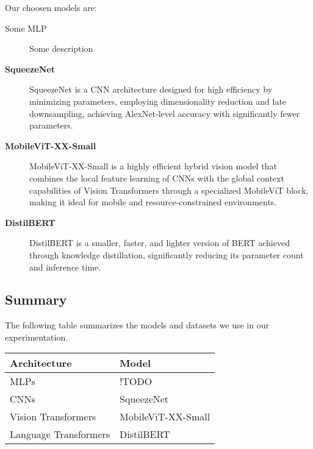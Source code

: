 \documentclass{article}
\begin{document}
Our choosen models are:
\begin{description}
    \item[Some MLP] {Some description}
    \item[\textbf{SqueezeNet \cite{squeezenet}}] SqueezeNet is a CNN architecture designed for high efficiency by minimizing parameters, employing dimensionality reduction and late downsampling, achieving AlexNet-level accuracy with significantly fewer parameters.
    \item[\textbf{MobileViT-XX-Small \cite{mobilevit}}] MobileViT-XX-Small is a highly efficient hybrid vision model that combines the local feature learning of CNNs with the global context capabilities of Vision Transformers through a specialized MobileViT block, making it ideal for mobile and resource-constrained environments.
    \item[\textbf{DistilBERT \cite{distilbert}}] DistilBERT is a smaller, faster, and lighter version of BERT achieved through knowledge distillation, significantly reducing its parameter count and inference time.
\end{description}

\subsection{Summary}

The following table summarizes the models and datasets we use in our experimentation.

\begin{longtable}{p{} p{}}
	\toprule
	\textbf{Architecture} & \textbf{Model}                           \\
	\midrule
	\endhead
	\bottomrule
	\endfoot
	\bottomrule
	\endlastfoot
	MLPs & !TODO \\
	\midrule
  CNNs & SqueezeNet \cite{squeezenet} \\
	\midrule
	Vision Transformers & MobileViT-XX-Small \cite{mobilevit}                                 \\
	\midrule
  Language Transformers & DistilBERT \cite{distilbert} \\
\end{longtable}
\end{document}
